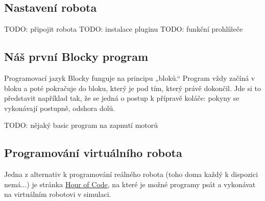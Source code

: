 \documentclass[../main.tex]{subfiles}
\begin{document}
	\subsection{Nastavení robota}

	TODO: připojit robota
	TODO: instalace pluginu
	TODO: funkční prohlížeče

	\subsection{Náš první Blocky program}

	Programovací jazyk Blocky funguje na principu „bloků.“ Program vždy začíná v bloku  a poté pokračuje do bloku, který je pod tím, který právě dokončil. Jde si to představit například tak, že se jedná o postup k přípravě koláče: pokyny se vykonávají postupně, odshora dolů.

	TODO: nějaký basic program na zapnutí motorů

	\subsection{Programování virtuálního robota}
	Jedna z alternativ k programování reálného robota (toho doma každý k dispozici nemá...) je stránka \href{http://www.robotmesh.com/create/176384}{Hour of Code}, na které je možné programy psát a vykonávat na virtuálním robotovi v simulaci.
\end{document}
